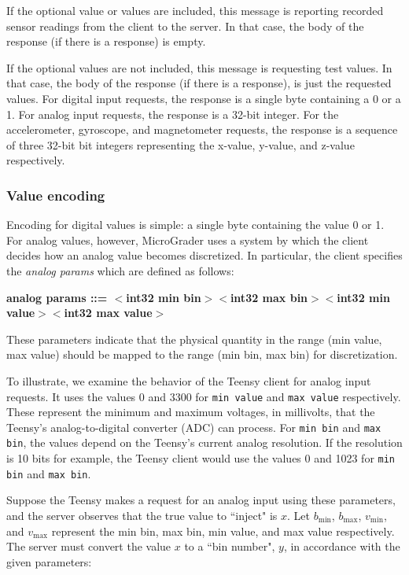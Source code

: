 \documentclass[12pt]{article}
\begin{document}
\begin{appendices}
If the optional value or values are included, this message is reporting recorded sensor readings from the client to the server.  In that case, the body of the response (if there is a response) is empty.  

If the optional values are not included, this message is requesting test values.  In that case, the body of the response (if there is a response), is just the requested values.  For digital input requests, the response is a single byte containing a 0 or a 1.  For analog input requests, the response is a 32-bit integer.  For the accelerometer, gyroscope, and magnetometer requests, the response is a sequence of three 32-bit bit integers representing the x-value, y-value, and z-value respectively.

\subsubsection{Value encoding}
Encoding for digital values is simple: a single byte containing the value 0 or 1.  For analog values, however, MicroGrader uses a system by which the client decides how an analog value becomes discretized.  In particular, the client specifies the \textit{analog params} which are defined as follows:

\footnotesize
\textbf{analog params ::= $<$int32 min bin$>$$<$int32 max bin$>$$<$int32 min value$>$$<$int32 max value$>$}
\normalsize

\noindent These parameters indicate that the physical quantity in the range (min value, max value) should be mapped to the range (min bin, max bin) for discretization.

To illustrate, we examine the behavior of the Teensy client for analog input requests.  It uses the values 0 and 3300 for \texttt{min value} and \texttt{max value} respectively.  These represent the minimum and maximum voltages, in millivolts, that the Teensy's analog-to-digital converter (ADC) can process.  For \texttt{min bin} and \texttt{max bin}, the values depend on the Teensy's current analog resolution.  If the resolution is 10 bits for example, the Teensy client would use the values 0 and 1023 for \texttt{min bin} and \texttt{max bin}.

Suppose the Teensy makes a request for an analog input using these parameters, and the server observes that the true value to ``inject" is $x$.  Let $b_{\text{min}}$, $b_{\text{max}}$, $v_{\text{min}}$, and $v_{\text{max}}$ represent the min bin, max bin, min value, and max value respectively.  The server must convert the value $x$ to a ``bin number", $y$, in accordance with the given parameters:


\end{appendices}
\end{document}
